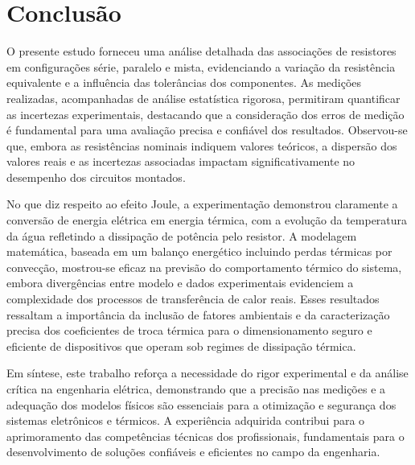 \documentclass[conference]{IEEEtran}
\begin{document}


\section{Conclusão} %

O presente estudo forneceu uma análise detalhada das associações de resistores em configurações série, paralelo e mista, evidenciando a variação da resistência equivalente e a influência das tolerâncias dos componentes. As medições realizadas, acompanhadas de análise estatística rigorosa, permitiram quantificar as incertezas experimentais, destacando que a consideração dos erros de medição é fundamental para uma avaliação precisa e confiável dos resultados. Observou-se que, embora as resistências nominais indiquem valores teóricos, a dispersão dos valores reais e as incertezas associadas impactam significativamente no desempenho dos circuitos montados.

No que diz respeito ao efeito Joule, a experimentação demonstrou claramente a conversão de energia elétrica em energia térmica, com a evolução da temperatura da água refletindo a dissipação de potência pelo resistor. A modelagem matemática, baseada em um balanço energético incluindo perdas térmicas por convecção, mostrou-se eficaz na previsão do comportamento térmico do sistema, embora divergências entre modelo e dados experimentais evidenciem a complexidade dos processos de transferência de calor reais. Esses resultados ressaltam a importância da inclusão de fatores ambientais e da caracterização precisa dos coeficientes de troca térmica para o dimensionamento seguro e eficiente de dispositivos que operam sob regimes de dissipação térmica.

Em síntese, este trabalho reforça a necessidade do rigor experimental e da análise crítica na engenharia elétrica, demonstrando que a precisão nas medições e a adequação dos modelos físicos são essenciais para a otimização e segurança dos sistemas eletrônicos e térmicos. A experiência adquirida contribui para o aprimoramento das competências técnicas dos profissionais, fundamentais para o desenvolvimento de soluções confiáveis e eficientes no campo da engenharia.
\end{document}

